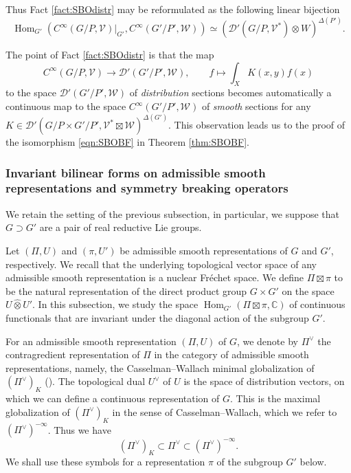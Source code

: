Thus Fact \ref{fact:SBOdistr} may be reformulated
 as the following linear bijection
\begin{equation}
\label{eqn:SBOdistr}
   {\operatorname{Hom}}_{G'}
   (C^{\infty}(G/P, {\mathcal{V}})|_{G'}, C^{\infty}(G'/P', {\mathcal{W}}))
   \simeq
   ({\mathcal{D}}'(G/P, {\mathcal{V}}^{\ast}) \otimes W)^{\Delta(P')}.  
\end{equation}


The point of Fact \ref{fact:SBOdistr} is 
 that the map
\[
   C^{\infty}(G/P, {\mathcal{V}}) 
  \to {\mathcal{D}}'(G'/P', {\mathcal{W}}), 
\qquad
   f \mapsto \int_X K(x,y) f(x)
\]
to the space ${\mathcal{D}}'(G'/P', {\mathcal{W}})$
 of {\it{distribution}} sections
 becomes automatically a continuous map
 to the space $C^{\infty}(G'/P', {\mathcal{W}})$
 of {\it{smooth}} sections 
 for any $K\in {\mathcal{D}}'(G/P \times G'/P', {\mathcal{V}}^{\ast} \boxtimes {\mathcal{W}})^{\Delta(G')}$.  
This observation leads us to the proof of the isomorphism 
 \eqref{eqn:SBOBF} in Theorem \ref{thm:SBOBF}.  



\subsubsection{Invariant bilinear forms
 on admissible smooth representations
 and symmetry breaking operators}
\label{subsec:BFSBO}
We retain the setting
 of the previous subsection,
 in particular,
 we suppose
 that $G \supset G'$
 are a pair of real reductive Lie groups.  



Let $(\Pi,U)$ and $(\pi,U')$ be admissible smooth representations
 of $G$ and $G'$, 
 respectively.  
We recall that the underlying topological vector space
 of any admissible smooth representation
 is a nuclear Fr{\'e}chet space.  
We define $\Pi \boxtimes \pi$ 
 to be the natural representation
 of the direct product group $G \times G'$
 on the space $U \widehat \otimes U'$.  
In this subsection,
 we study the space
 ${\operatorname{Hom}}_{G'}(\Pi \boxtimes \pi,{\mathbb{C}})$
 of continuous functionals
 that are invariant under the diagonal action
 of the subgroup $G'$.  



For an admissible smooth representation $(\Pi,U)$ of $G$, 
 we denote by $\Pi^{\vee}$ the contragredient representation 
 of $\Pi$
 in the category of admissible smooth representations, 
 namely,
 the Casselman--Wallach minimal globalization of $(\Pi^{\vee})_K$
 (\cite[Chap.~11]{W}).  
The topological dual $U^{\vee}$ of $U$ is the space
 of distribution vectors,
 on which we can define a continuous representation of $G$.  
This is the maximal globalization of $(\Pi^{\vee})_K$
 in the sense of Casselman--Wallach, 
 which we refer to $(\Pi^{\vee})^{-\infty}$.  
Thus we have
\[
   (\Pi^{\vee})_K \subset \Pi^{\vee} \subset (\Pi^{\vee})^{-\infty}.  
\]
We shall use these symbols
 for a representation $\pi$ of the subgroup $G'$ below.  


